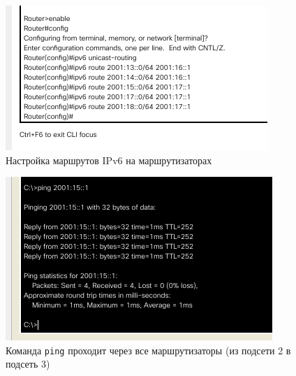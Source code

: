 \documentclass[12pt]{report}
\begin{document}
\begin{figure}[H]
	\begin{center}
		\includegraphics[scale=0.8]{img/15.png}
	\end{center}
	\caption{Настройка маршрутов IPv6 на маршрутизаторах}
	\label{fig:15}
\end{figure}

\begin{figure}[H]
	\begin{center}
		\includegraphics[scale=0.8]{img/16.png}
	\end{center}
	\caption{Команда \texttt{ping} проходит через все маршрутизаторы (из подсети 2 в подсеть 3)}
	\label{fig:16}
\end{figure}



	
\end{document}
